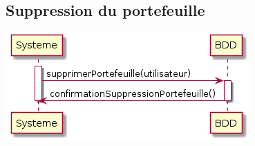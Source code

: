 \subsection{Suppression du portefeuille}
\includegraphics[scale=0.5]{../graph/DiagrammeSequenceSuppressionPortefeuille.png} \\